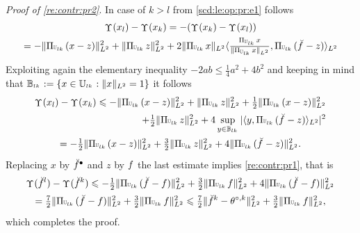 \begin{pro}
\begin{multline*}
\end{multline*}
\textit{Proof of \eqref{re:contr:pr2}}. In case of $k>l$  from
\eqref{scd:le:op:pr:e1} follows
\begin{multline*}
\contr[](x_l)-\contr[](x_k)=-(\contr[](x_k)-\contr[](x_l))\\=-\VnormLp{\dProj{l}{k}(x-z)}^2+\VnormLp{\dProj{l}{k}z}^2+2\VnormLp{\dProj{l}{k}x}\VskalarLp{\tfrac{\dProj{l}{k}x}{\VnormLp{\dProj{l}{k}x}},\dProj{l}{k}(\dxdfPr[]-z)}
\end{multline*}
Exploiting again the elementary inequality $-2ab\leq \tfrac{1}{4}a^2+4b^2$
and keeping in mind that $\dmBaH{l}{k}:=\{x\in\dmHiH{l}{k}:\VnormLp{x}=1\}$
it follows 
\begin{multline*}
\contr[](x_l)-\contr[](x_k)%
\leq-\VnormLp{\dProj{l}{k}(x-z)}^2+\VnormLp{\dProj{l}{k}z}^2+ \tfrac{1}{2}\VnormLp{\dProj{l}{k}(x-z)}^2\\\hfill+ \tfrac{1}{2}\VnormLp{\dProj{l}{k}z}^2 +
4\sup_{y\in\dmBaH{l}{k}} |\VskalarLp{y,\dProj{l}{k}(\dxdfPr[]-z)}|^2\\
=-\tfrac{1}{2}\VnormLp{\dProj{l}{k}(x-z)}^2+\tfrac{3}{2}\VnormLp{\dProj{l}{k}z}^2+ 4 \VnormLp{\dProj{l}{k}(\dxdfPr[]-z)}^2.
\end{multline*}
Replacing $x$ by $\dxdfPr[\bullet]$ and $z$ by $\xdf$ the last estimate
 implies \eqref{re:contr:pr1}, that is
\begin{multline*}
\contr[](\dxdfPr[l])-\contr[](\dxdfPr[k])
\leq -\tfrac{1}{2}\VnormLp{\dProj{l}{k}(\dxdfPr[]-\xdf)}^2+\tfrac{3}{2}
\VnormLp{\dProj{l}{k}\xdf}^2 + 4 \VnormLp{\dProj{l}{k}(\dxdfPr[]-\xdf)}^2\\
=\tfrac{7}{2}\VnormLp{\dProj{l}{k}(\dxdfPr[]-\xdf)}^2+\tfrac{3}{2}
\VnormLp{\dProj{l}{k}\xdf}^2%
\leq \tfrac{7}{2}\VnormLp{\dxdfPr[k]-\xdfPr[k]}^2+\tfrac{3}{2}\VnormLp{\dProj{l}{k}\xdf}^2,
\end{multline*}
 which completes the proof.\proEnd
\end{pro}


